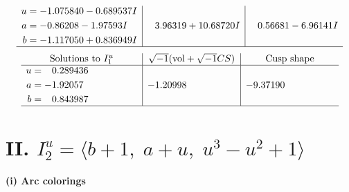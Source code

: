 \documentclass[1p]{elsarticle_modified}
\theoremstyle{definition}
\newcommand{\I}{\sqrt{-1}}
\begin{document}
$$\begin{array}{c|c|c}
\begin{aligned}
u &= -1.075840 - 0.689537 I \\
a &= -0.86208 - 1.97593 I \\
b &= -1.117050 + 0.836949 I\end{aligned}
 & \phantom{-}3.96319 + 10.68720 I & \phantom{-}0.56681 - 6.96141 I\\
 \hline 
 \end{array}$$\newpage$$\begin{array}{c|c|c}  
\text{Solutions to }I^u_{1}& \I (\text{vol} + \sqrt{-1}CS) & \text{Cusp shape}\\
 \hline 
\begin{aligned}
u &= \phantom{-}0.289436\phantom{ +0.000000I} \\
a &= -1.92057\phantom{ +0.000000I} \\
b &= \phantom{-}0.843987\phantom{ +0.000000I}\end{aligned}
 & -1.20998\phantom{ +0.000000I} & -9.37190\phantom{ +0.000000I}\\
 \hline 
 \end{array}$$\newpage\newpage\renewcommand{\arraystretch}{1}
\centering \section*{II. $I^u_{2}= \langle b+1,\;a+u,\;u^3- u^2+1 \rangle$}
\flushleft \textbf{(i) Arc colorings}\\
\end{document}
